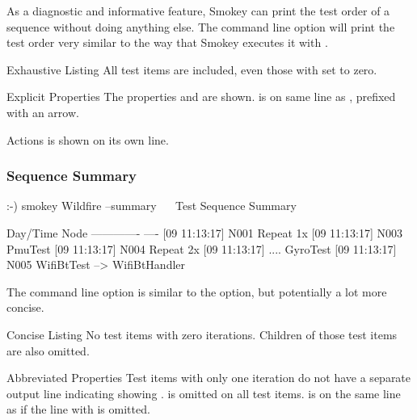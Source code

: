 As a diagnostic and informative feature, Smokey can print the test order of a
sequence without doing anything else.  The  command line
option will print the test order very similar to the way that Smokey executes
it with .

\begin{Descriptive}

	\item[Exhaustive Listing] All test items are included, even those with
	 set to zero.

	\item[Explicit Properties] The properties  and
	 are shown.   is on same line
	as , prefixed with an arrow.

	\item[Actions]  is shown on its own line.

\end{Descriptive}

\subsubsection{Sequence Summary}

\begin{LogExcerpt}
:-) smokey Wildfire --summary
~\elide~
Test Sequence Summary

Day/Time      Node
------------- ----
[09 11:13:17] N001 Repeat 1x
[09 11:13:17] N003      PmuTest
[09 11:13:17] N004      Repeat 2x
[09 11:13:17] ....              GyroTest
[09 11:13:17] N005      WifiBtTest --> WifiBtHandler
\end{LogExcerpt}

The  command line option is similar to the
 option, but potentially a lot more concise.

\begin{Descriptive}

	\item[Concise Listing] No test items with zero iterations.  Children of
	those test items are also omitted.

	\item[Abbreviated Properties] Test items with only one iteration do not
	have a separate output line indicating showing
	.   is omitted on all test
	items.   is on the same line as 
	if the line with  is omitted.

\end{Descriptive}

